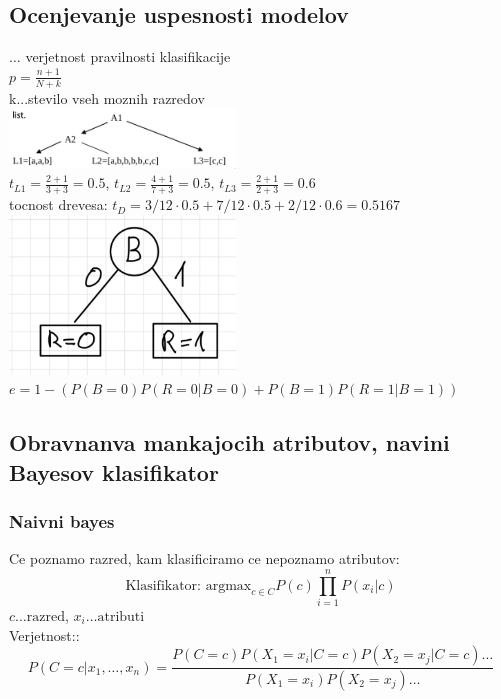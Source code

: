 \subsection{Ocenjevanje uspesnosti modelov}
 $\dots$ verjetnost pravilnosti klasifikacije\\
 $p=\frac{n+1}{N+k}$\\
k...stevilo vseh moznih razredov\\
\includegraphics[width=6cm]{./images/drevo-laplace.png}\\
$t_{L1}=\frac{2+1}{3+3}=0.5$,
$t_{L2}=\frac{4+1}{7+3}=0.5$,
$t_{L3}=\frac{2+1}{2+3}=0.6$\\
tocnost drevesa: $t_D=3/12\cdot 0.5 + 7/12\cdot 0.5 + 2/12\cdot 0.6=0.5167$\\
\includegraphics[width=6cm]{./images/klasifikacijska-napaka.png}\\
$e=1-(P(B=0)P(R=0|B=0)+P(B=1)P(R=1|B=1))$\\


\subsection{Obravnanva mankajocih atributov, navini Bayesov klasifikator}
\subsubsection{Naivni bayes}
Ce poznamo razred, kam klasificiramo ce nepoznamo atributov:
$$\text{Klasifikator: }\text{argmax}_{c\in C} P(c)\prod_{i=1}^n P(x_i|c)$$
$c\dots \text{razred}$, $x_i\dots \text{atributi}$\\
Verjetnost::
$$P(C=c|x_1,\dots,x_n)=\frac{P(C=c)P(X_1=x_i|C=c)P(X_2=x_j|C=c)\dots}{P(X_1=x_i)P(X_2=x_j)\dots}$$

